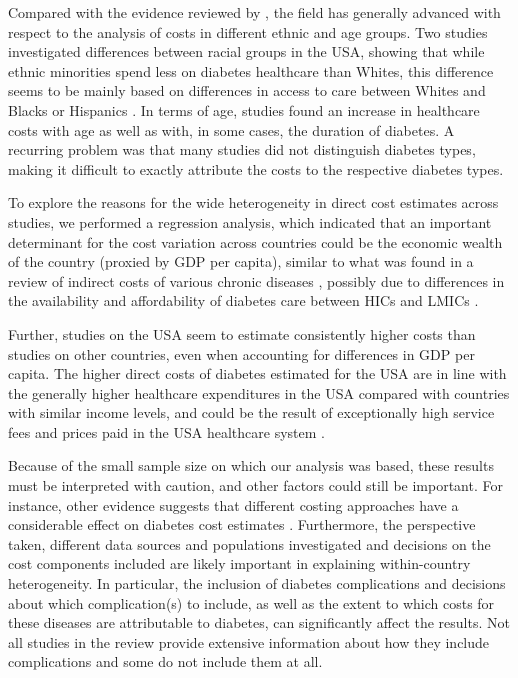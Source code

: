 Compared with the evidence reviewed by \textcite{Ettaro2004}, the field has generally advanced with respect to the analysis of costs in different ethnic and age groups. Two studies investigated differences between racial groups in the USA, showing that while ethnic minorities spend less on diabetes healthcare than Whites, this difference seems to be mainly based on differences in access to care between Whites and Blacks or Hispanics \parencite{Lee2006,Buescher2010}. In terms of age, studies found an increase in healthcare costs with age as well as with, in some cases, the duration of diabetes. A recurring problem was that many studies did not distinguish diabetes types, making it difficult to exactly attribute the costs to the respective diabetes types.

To explore the reasons for the wide heterogeneity in direct cost estimates across studies, we performed a regression analysis, which indicated that an important determinant for the cost variation across countries could be the economic wealth of the country (proxied by \ac{GDP} per capita), similar to what was found in a review of indirect costs of various chronic diseases \parencite{Zhao2013}, possibly due to differences in the availability and affordability of diabetes care between \acp{HIC} and \acp{LMIC}  \parencite{Cameron2009g,Cameron2011b}. 

Further, studies on the USA seem to estimate consistently higher costs than studies on other countries, even when accounting for differences in \ac{GDP} per capita. The higher direct costs of diabetes estimated for the USA are in line with the generally higher healthcare expenditures in the USA compared with countries with similar income levels, and could be the result of exceptionally high service fees \parencite{Laugesen2011} and prices paid in the USA healthcare system \parencite{Squires2012,Lorenzoni2014}.

Because of the small sample size on which our analysis was based, these results must be interpreted with caution, and other factors could still be important. For instance, other evidence suggests that different costing approaches have a considerable effect on diabetes cost estimates \parencite{Tunceli2010c,Honeycutt2009a}. Furthermore, the perspective taken, different data sources and populations investigated and decisions on the cost components included are likely important in explaining within-country heterogeneity. In particular, the inclusion of diabetes complications and decisions about which complication(s) to include, as well as the extent to which costs for these diseases are attributable to diabetes, can significantly affect the results. Not all studies in the review provide extensive information about how they include complications and some do not include them at all.

